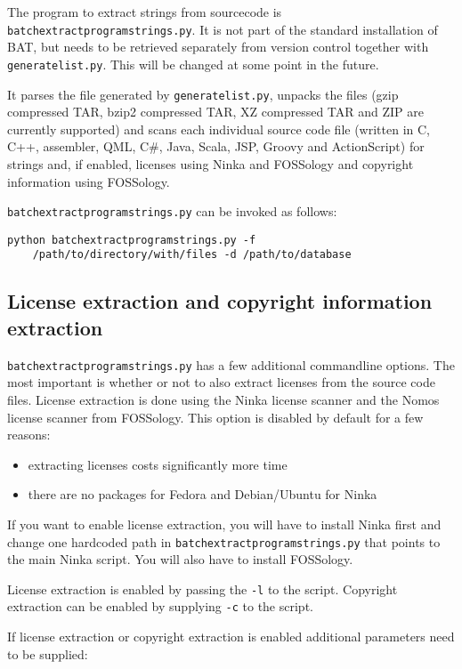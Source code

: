 \documentclass[10pt]{article}
\begin{document}
The program to extract strings from sourcecode is
\texttt{batchextractprogramstrings.py}. It is not part of the standard
installation of BAT, but needs to be retrieved separately from version control
together with \texttt{generatelist.py}.  This will be changed at some point in
the future.

It parses the file generated by \texttt{generatelist.py}, unpacks the files
(gzip compressed TAR, bzip2 compressed TAR, XZ compressed TAR and ZIP are
currently supported) and scans each individual source code file (written in C,
C++, assembler, QML, C\#, Java, Scala, JSP, Groovy and ActionScript) for strings
and, if enabled, licenses using Ninka and FOSSology and copyright information
using FOSSology.

\texttt{batchextractprogramstrings.py} can be invoked as follows:

\begin{verbatim}
python batchextractprogramstrings.py -f
    /path/to/directory/with/files -d /path/to/database
\end{verbatim}

\subsection{License extraction and copyright information extraction}

\texttt{batchextractprogramstrings.py} has a few additional commandline
options. The most important is whether or not to also extract licenses from
the source code files.  License extraction is done using the Ninka license
scanner and the Nomos license scanner from FOSSology. This option is disabled
by default for a few reasons:

\begin{itemize}
\item extracting licenses costs significantly more time
\item there are no packages for Fedora and Debian/Ubuntu for Ninka
\end{itemize}

If you want to enable license extraction, you will have to install Ninka first
and change one hardcoded path in \texttt{batchextractprogramstrings.py} that
points to the main Ninka script. You will also have to install FOSSology.

License extraction is enabled by passing the \texttt{-l} to the script.
Copyright extraction can be enabled by supplying \texttt{-c} to the script.

If license extraction or copyright extraction is enabled additional parameters
need to be supplied:
\end{document}
